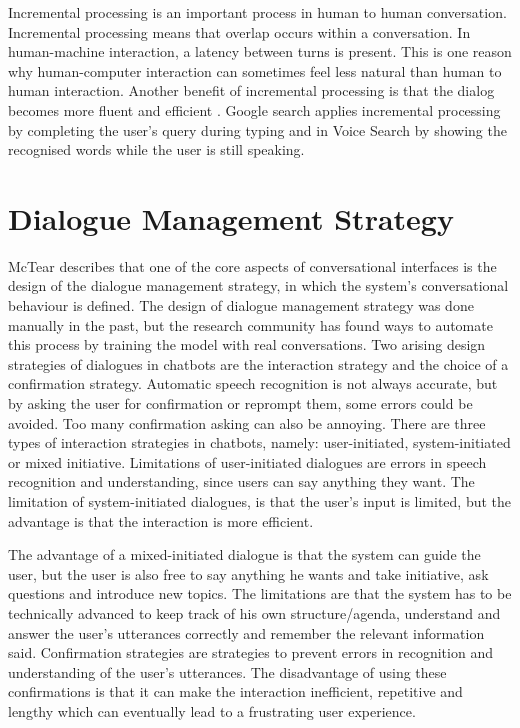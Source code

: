 Incremental processing is an important process in human to human conversation. Incremental processing means that overlap occurs within a conversation. In human-machine interaction, a latency between turns is present. This is one reason why human-computer interaction can sometimes feel less natural than human to human interaction. Another benefit of incremental processing is that the dialog becomes more fluent and efficient \cite{mctear2016}. Google search applies incremental processing by completing the user’s query during typing and in Voice Search by showing the recognised words while the user is still speaking.




\section{Dialogue Management Strategy} %

McTear \cite{mctear2016} describes that one of the core aspects of conversational interfaces is the design of the dialogue management strategy, in which the system’s conversational behaviour is defined. The design of dialogue management strategy was done manually in the past, but the research community has found ways to automate this process by training the model with real conversations. Two arising design strategies of dialogues in chatbots are the interaction strategy and the choice of a confirmation strategy. Automatic speech recognition is not always accurate, but by asking the user for confirmation or reprompt them, some errors could be avoided. Too many confirmation asking can also be annoying. There are three types of interaction strategies in chatbots, namely: user-initiated, system-initiated or mixed initiative. Limitations of user-initiated dialogues are errors in speech recognition and understanding, since users can say anything they want. The limitation of system-initiated dialogues, is that the user’s input is limited, but the advantage is that the interaction is more efficient. 

The advantage of a mixed-initiated dialogue is that the system can guide the user, but the user is also free to say anything he wants and take initiative, ask questions and introduce new topics. The limitations are that the system has to be technically advanced to keep track of his own structure/agenda, understand and answer the user’s utterances correctly and remember the relevant information said. Confirmation strategies are strategies to prevent errors in recognition and understanding of the user’s utterances. The disadvantage of using these confirmations is that it can make the interaction inefficient, repetitive and lengthy which can eventually lead to a frustrating user experience. 

